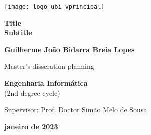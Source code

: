 \begin{titlepage}
\begin{center}

\begin{flushright}
 \texttt{[image: logo\_ubi\_vprincipal]}\\


\vspace{7.6cm}

\rostotitulo \textbf{Title} \\
\rostosubtit \textbf{Subtitle}\\

\vspace{1.8cm}

\rostonomes \textbf{Guilherme João Bidarra Breia Lopes}\\

\vspace{1.4cm}


\rostooutros Master's disseration planning

\rostonomes \textbf{Engenharia Informática}\\
\rostooutros (2nd degree cycle)\\

\vspace{3.3cm}

\rostooutros Supervisor: Prof. Doctor Simão Melo de Sousa\\

\vspace{1.4cm}

\rostooutros \textbf{janeiro de 2023}

\end{flushright}

\end{center}
\end{titlepage}

